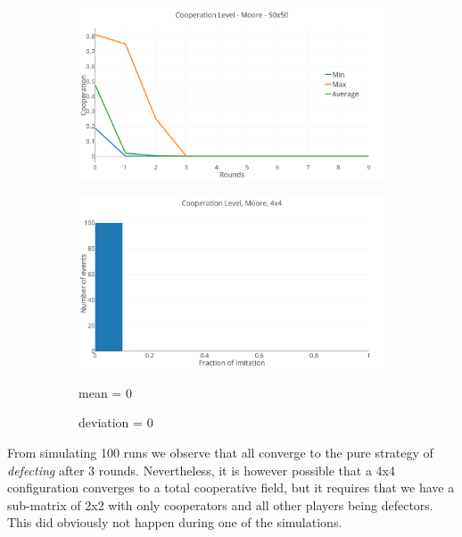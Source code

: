 \documentclass[a4paper, 11pt]{article}
\begin{document}
\begin{figure}[H]
\begin{subfigure}{.75\textwidth}
	\includegraphics[width=1\linewidth]{PDMoore4x4}
\end{subfigure}

\begin{subfigure}{.75\textwidth}
	\includegraphics[width=1\linewidth]{PDMoore4x4HG}
\end{subfigure}%
\begin{subfigure}{.25\textwidth}
	mean = $0$
	
	deviation = $0$
\end{subfigure}

\end{figure}

	From simulating 100 runs we observe that all converge to the pure strategy of \textit{defecting} after 3 rounds. Nevertheless, it is however possible that a 4x4 configuration converges to a total cooperative field, but it requires that we have a sub-matrix of 2x2 with only cooperators and all other players being defectors. This did obviously not happen during one of the simulations.
\end{document}
